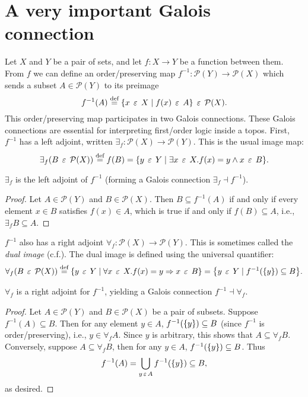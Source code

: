 \documentclass{../thesis-note}
\newcommand\Pcal{{\mathcal{P}}}
\begin{document}
\section{A very important Galois connection}

Let \(X\) and \(Y\) be a pair of sets, and let \(f: X \to Y\) be a function
between them. From \(f\) we can define an order\-/preserving map
\(f^{-1} : \Pcal(Y) \to \Pcal(X)\) which sends a subset \(A \in \Pcal(Y)\) to
its preimage
\[%
  f^{-1}(A) \eqdef \bwrap{ x \in X \mid f(x) \in A } \in \Pcal(X).
\]%
This order\-/preserving map participates in two Galois connections. These Galois
connections are essential for interpreting first\-/order logic inside a
topos. First, \(f^{-1}\) has a left adjoint, written
\(\exists_f : \Pcal(X) \to \Pcal(Y)\). This is the usual image map:
\[%
  \exists_f \pwrap{B \in \Pcal(X)} \eqdef f(B) = \bwrap{ y \in Y \mid \exists x
    \in X. f(x) = y \wedge x \in B }.
\]%
\begin{proposition}
  \(\exists_f\) is the left adjoint of \(f^{-1}\) (forming a Galois connection
  \(\exists_f \dashv f^{-1}\)).
\end{proposition}
\begin{proof}
  Let \(A \in \Pcal(Y)\) and \(B \in \Pcal(X)\). Then \(B \subseteq f^{-1}(A)\)
  if and only if every element \(x \in B\) satisfies \(f(x) \in A\), which is
  true if and only if \(f(B) \subseteq A\), i.e., \(\exists_f B \subseteq A\).
\end{proof}
\(f^{-1}\) also has a right adjoint \(\forall_f : \Pcal(X) \to \Pcal(Y)\). This
is sometimes called the \emph{dual image} (c.f.\linebreak\cite{Makkai1977}). The
dual image is defined using the universal quantifier:
\[%
  \forall_f \pwrap{B \in \Pcal(X)} \eqdef \bwrap{%
    y \in Y \mid \forall x \in X. f(x) = y \Rightarrow x \in B
  } = \bwrap{%
    y \in Y \mid f^{-1}(\bwrap{y}) \subseteq B
  }.%
\]%
\begin{proposition}
  \(\forall_f\) is a right adjoint for \(f^{-1}\), yielding a Galois connection
  \(f^{-1} \dashv \forall_f\).
\end{proposition}
\begin{proof}
  Let \(A \in \Pcal(Y)\) and \(B \in \Pcal(X)\) be a pair of subsets. Suppose
  \(f^{-1}(A) \subseteq B\). Then for any element \(y \in A\),
  \(f^{-1}({\left\{y\right\}}) \subseteq B\) (since \(f^{-1}\) is order\-/preserving),
  i.e., \(y \in \forall_f A\). Since \(y\) is arbitrary, this shows that \(A
  \subseteq \forall_f B\). Conversely, suppose \(A \subseteq \forall_f B\), then
  for any \(y \in A\), \(f^{-1}({\left\{y\right\}}) \subseteq B\). Thus
  \[%
    f^{-1}(A) = \bigcup_{y \in A} f^{-1}(\bwrap{y}) \subseteq B,
  \]%
  as desired.
\end{proof}
\end{document}
